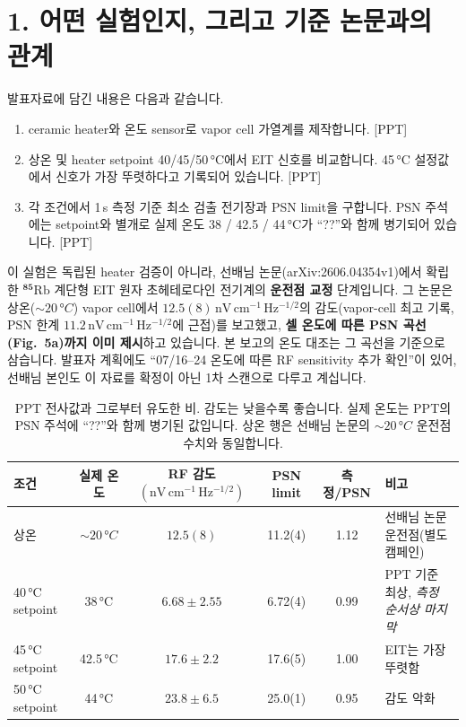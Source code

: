 \documentclass[10pt,a4paper]{article}
\newcommand{\Status}[1]{\textsf{\footnotesize[#1]}}
\newcommand{\sensunit}{\mathrm{nV\,cm^{-1}\,Hz^{-1/2}}}
\begin{document}
\section*{1. 어떤 실험인지, 그리고 기준 논문과의 관계}

발표자료에 담긴 내용은 다음과 같습니다.

\begin{enumerate}
  \setlength{\itemsep}{0.15em}
  \item ceramic heater와 온도 sensor로 vapor cell 가열계를 제작합니다. \Status{PPT}
  \item 상온 및 heater setpoint 40/45/50\,°C에서 EIT 신호를 비교합니다. 45\,°C 설정값에서
        신호가 가장 뚜렷하다고 기록되어 있습니다. \Status{PPT}
  \item 각 조건에서 1\,s 측정 기준 최소 검출 전기장과 PSN limit을 구합니다. PSN 주석에는
        setpoint와 별개로 실제 온도 38 / 42.5 / 44\,°C가 ``??''와 함께 병기되어 있습니다. \Status{PPT}
\end{enumerate}

이 실험은 독립된 heater 검증이 아니라, 선배님 논문(arXiv:2606.04354v1)에서 확립한
\(\mathbf{{}^{85}\mathrm{Rb}}\) 계단형 EIT 원자 초헤테로다인 전기계의 \textbf{운전점 교정} 단계입니다.
그 논문은 상온(\(\sim20\,°C\)) vapor cell에서 \(12.5(8)\,\sensunit\)의 감도(vapor-cell 최고 기록,
PSN 한계 \(11.2\,\sensunit\)에 근접)를 보고했고, \textbf{셀 온도에 따른 PSN 곡선(Fig.\ 5a)까지
이미 제시}하고 있습니다. 본 보고의 온도 대조는 그 곡선을 기준으로 삼습니다.
발표자 계획에도 ``07/16--24 온도에 따른 RF sensitivity 추가 확인''이 있어, 선배님 본인도 이 자료를
확정이 아닌 1차 스캔으로 다루고 계십니다.

\begin{table}[h]
\centering
\small
\caption{PPT 전사값과 그로부터 유도한 비. 감도는 낮을수록 좋습니다. 실제 온도는 PPT의 PSN
주석에 ``??''와 함께 병기된 값입니다. 상온 행은 선배님 논문의 \(\sim20\,°C\) 운전점 수치와 동일합니다.}
\begin{tabular}{lccccl}
\toprule
조건 & 실제 온도 & RF 감도 \((\sensunit)\) & PSN limit & 측정/PSN & 비고\\
\midrule
상온 & \(\sim20\,°C\) & \(12.5(8)\) & 11.2(4) & 1.12 & 선배님 논문 운전점(별도 캠페인)\\
40\,°C setpoint & 38\,°C & \(\mathbf{6.68\pm2.55}\) & 6.72(4) & 0.99 & PPT 기준 최상, \emph{측정 순서상 마지막}\\
45\,°C setpoint & 42.5\,°C & \(17.6\pm2.2\) & 17.6(5) & 1.00 & EIT는 가장 뚜렷함\\
50\,°C setpoint & 44\,°C & \(23.8\pm6.5\) & 25.0(1) & 0.95 & 감도 악화\\
\bottomrule
\end{tabular}
\end{table}
\end{document}
